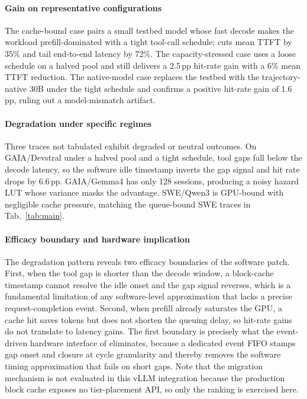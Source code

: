

\paragraph{Gain on representative configurations}
The cache-bound case pairs a small testbed model whose fast decode
makes the workload prefill-dominated with a tight tool-call schedule;
\spear cuts mean TTFT by 35\% and tail end-to-end latency by 72\%. The
capacity-stressed case uses a loose schedule on a halved pool and
still delivers a 2.5\,pp hit-rate gain with a 6\% mean TTFT
reduction. The native-model case replaces the testbed with the
trajectory-native 30B under the tight schedule and confirms a positive
hit-rate gain of 1.6\,pp, ruling out a model-mismatch artifact.

\paragraph{Degradation under specific regimes}
Three traces not tabulated exhibit degraded or neutral outcomes.
On GAIA/Devstral under a halved pool and a tight schedule, tool gaps
fall below the decode latency, so the software idle timestamp inverts
the gap signal and hit rate drops by $6.6$\,pp. GAIA/Gemma4 has only
128 sessions, producing a noisy hazard LUT whose variance masks the
\spear advantage. SWE/Qwen3 is GPU-bound with negligible cache
pressure, matching the queue-bound SWE traces in
Tab.~\ref{tab:main}.

\paragraph{Efficacy boundary and hardware implication}
The degradation pattern reveals two efficacy boundaries of the
software patch. First, when the tool gap is shorter than the decode
window, a block-cache timestamp cannot resolve the idle onset and the
gap signal reverses, which is a fundamental limitation of any
software-level approximation that lacks a precise request-completion
event. Second, when prefill already saturates the GPU, a cache hit
saves tokens but does not shorten the queuing delay, so hit-rate gains
do not translate to latency gains. The first boundary is precisely what the event-driven hardware
interface of \unison eliminates, because a dedicated event FIFO stamps
gap onset and closure at cycle granularity and thereby removes the
software timing approximation that fails on short gaps. Note that the
\tide migration mechanism is not evaluated in this vLLM integration
because the production block cache exposes no tier-placement API, so
only the \spear ranking is exercised here.
